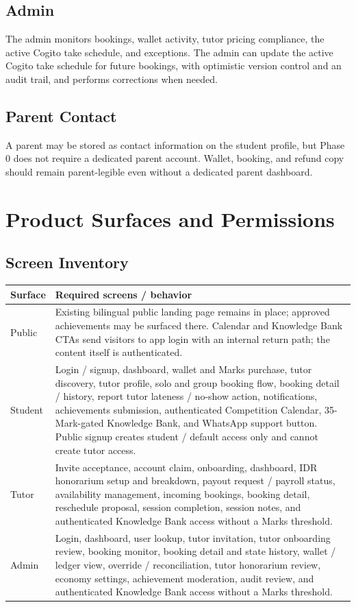 \documentclass[11pt,a4paper]{article}
\begin{document}
\subsection{Admin}
The admin monitors bookings, wallet activity, tutor pricing compliance, the active Cogito take schedule, and exceptions. The admin can update the active Cogito take schedule for future bookings, with optimistic version control and an audit trail, and performs corrections when needed.

\subsection{Parent Contact}
A parent may be stored as contact information on the student profile, but Phase 0 does not require a dedicated parent account.
Wallet, booking, and refund copy should remain parent-legible even without a dedicated parent dashboard.

\section{Product Surfaces and Permissions}

\subsection{Screen Inventory}

\begin{tabular}{|p{3.1cm}|p{11.1cm}|}
\hline
\textbf{Surface} & \textbf{Required screens / behavior} \\
\hline
Public & Existing bilingual public landing page remains in place; approved achievements may be surfaced there. Calendar and Knowledge Bank CTAs send visitors to app login with an internal return path; the content itself is authenticated. \\
\hline
Student & Login / signup, dashboard, wallet and Marks purchase, tutor discovery, tutor profile, solo and group booking flow, booking detail / history, report tutor lateness / no-show action, notifications, achievements submission, authenticated Competition Calendar, 35-Mark-gated Knowledge Bank, and WhatsApp support button. Public signup creates student / default access only and cannot create tutor access. \\
\hline
Tutor & Invite acceptance, account claim, onboarding, dashboard, IDR honorarium setup and breakdown, payout request / payroll status, availability management, incoming bookings, booking detail, reschedule proposal, session completion, session notes, and authenticated Knowledge Bank access without a Marks threshold. \\
\hline
Admin & Login, dashboard, user lookup, tutor invitation, tutor onboarding review, booking monitor, booking detail and state history, wallet / ledger view, override / reconciliation, tutor honorarium review, economy settings, achievement moderation, audit review, and authenticated Knowledge Bank access without a Marks threshold. \\
\hline
\end{tabular}
\end{document}
